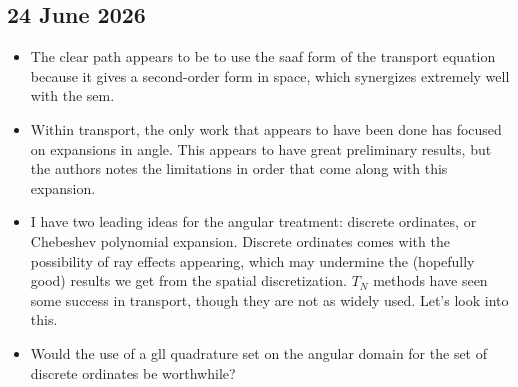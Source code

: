 \subsection*{24 June 2026}
\begin{itemize}
  \item The clear path appears to be to use the \gls{saaf} form of the transport equation because it gives a second-order form in space, which synergizes extremely well with the \gls{sem}.
  \item Within transport, the only work that appears to have been done has focused on \Pn expansions in angle. This appears to have great preliminary results, but the authors notes the limitations in order that come along with this expansion.
  \item I have two leading ideas for the angular treatment: discrete ordinates, or Chebeshev polynomial expansion. Discrete ordinates comes with the possibility of ray effects appearing, which may undermine the (hopefully good) results we get from the spatial discretization. $T_N$ methods have seen some success in transport, though they are not as widely used. Let's look into this.
  \item Would the use of a \gls{gll} quadrature set on the angular domain for the set of discrete ordinates be worthwhile?
\end{itemize}

